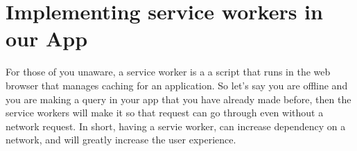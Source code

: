 \maketitle{}
\section{ Implementing service workers in our App }

For those of you unaware, a service worker is a a script that runs in the web
browser that manages caching for an application. So let's say you are offline
and you are making a query in your app that you have already made before, then
the service workers will make it so that request can go through even without a
network request. In short, having a servie worker, can increase dependency on a
network, and will greatly increase the user experience.
